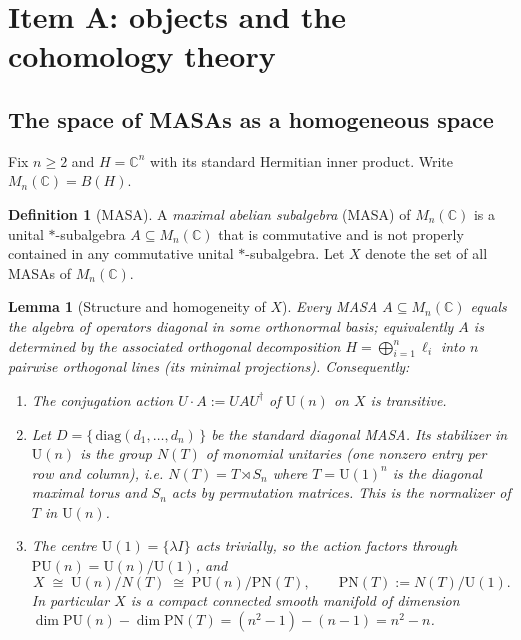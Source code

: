\documentclass[11pt]{article}
\newtheorem{lemma}[theorem]{Lemma}
\theoremstyle{definition}
\newtheorem{definition}[theorem]{Definition}
\newcommand{\U}{\mathrm{U}}
\newcommand{\PU}{\mathrm{PU}}
\newcommand{\PN}{\mathrm{PN}}
\newcommand{\Nt}{N(T)}
\newcommand{\C}{\mathbb{C}}
\begin{document}
\section{Item A: objects and the cohomology theory}\label{sec:A}

\subsection{The space of MASAs as a homogeneous space}

Fix $n\ge2$ and $H=\C^n$ with its standard Hermitian inner product. Write
$M_n(\C)=B(H)$.

\begin{definition}[MASA]
A \emph{maximal abelian subalgebra} (MASA) of $M_n(\C)$ is a unital $*$-subalgebra
$A\subseteq M_n(\C)$ that is commutative and is not properly contained in any commutative
unital $*$-subalgebra. Let $X$ denote the set of all MASAs of $M_n(\C)$.
\end{definition}

\begin{lemma}[Structure and homogeneity of $X$]\label{lem:homog}
Every MASA $A\subseteq M_n(\C)$ equals the algebra of operators diagonal in some
orthonormal basis; equivalently $A$ is determined by the associated orthogonal
decomposition $H=\bigoplus_{i=1}^n \ell_i$ into $n$ pairwise orthogonal lines (its minimal
projections). Consequently:
\begin{enumerate}
\item[(i)] The conjugation action $U\cdot A := UAU^{\dagger}$ of $\U(n)$ on $X$ is
transitive.
\item[(ii)] Let $D=\{\,\mathrm{diag}(d_1,\dots,d_n)\,\}$ be the standard diagonal MASA. Its
stabilizer in $\U(n)$ is the group $\Nt$ of \emph{monomial} unitaries (one nonzero entry
per row and column), i.e. $\Nt=T\rtimes S_n$ where $T=\U(1)^n$ is the diagonal maximal
torus and $S_n$ acts by permutation matrices. This is the normalizer of $T$ in $\U(n)$.
\item[(iii)] The centre $\U(1)=\{\lambda I\}$ acts trivially, so the action factors through
$\PU(n)=\U(n)/\U(1)$, and
\[
X\;\cong\;\U(n)/\Nt\;\cong\;\PU(n)/\PN(T),\qquad \PN(T):=\Nt/\U(1).
\]
In particular $X$ is a compact connected smooth manifold of dimension
$\dim\PU(n)-\dim\PN(T)=(n^2-1)-(n-1)=n^2-n$.
\end{enumerate}
\end{lemma}
\end{document}
